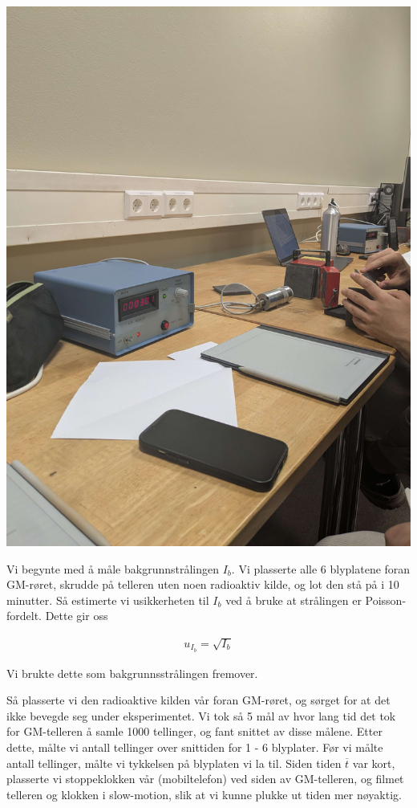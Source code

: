 \bigskip \hfil
\includegraphics[scale = 0.05]{Figurer/GM-Counter.jpg} 
\label{GM}
\par \bigskip

Vi begynte med å måle bakgrunnstrålingen $I_b$. Vi plasserte alle 6 blyplatene foran GM-røret, skrudde på telleren uten noen radioaktiv kilde, og lot den stå på i 10 minutter. Så estimerte vi usikkerheten til $I_b$ ved å bruke at strålingen er Poisson-fordelt. Dette gir oss

\begin{align}
    u_{I_b} = \sqrt{I_b}  \label{u_b}
\end{align}

Vi brukte dette som bakgrunnsstrålingen fremover. \medskip

Så plasserte vi den radioaktive kilden vår foran GM-røret, og sørget for at det ikke bevegde seg under eksperimentet. Vi tok så 5 mål av hvor lang tid det tok for GM-telleren å samle 1000 tellinger, og fant snittet av disse målene. Etter dette, målte vi antall tellinger over snittiden for 1 - 6 blyplater. Før vi målte antall tellinger, målte vi tykkelsen på blyplaten vi la til. Siden tiden $\overline{t}$ var kort, plasserte vi stoppeklokken vår (mobiltelefon) ved siden av GM-telleren, og filmet telleren og klokken i slow-motion, slik at vi kunne plukke ut tiden mer nøyaktig.\medskip

